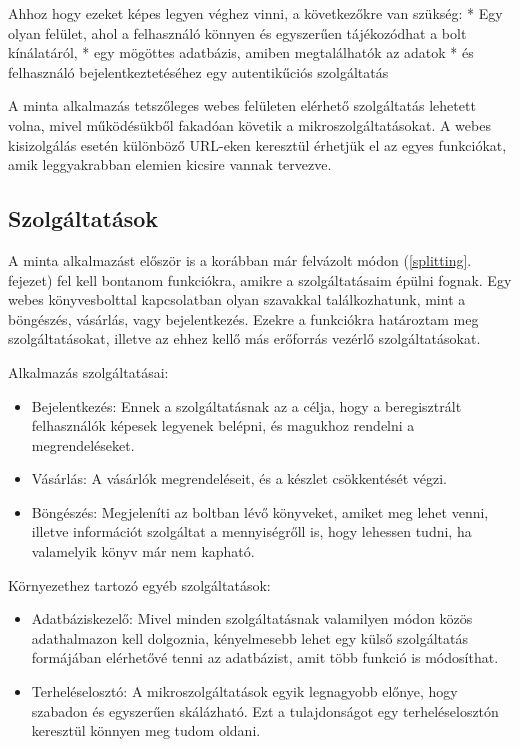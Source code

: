 \documentclass[11pt,magyar,a4paper,twoside,]{report}
\providecommand{\tightlist}{%
  \setlength{\itemsep}{0pt}\setlength{\parskip}{0pt}}
\begin{document}
Ahhoz hogy ezeket képes legyen véghez vinni, a következőkre van szükség:
* Egy olyan felület, ahol a felhasználó könnyen és egyszerűen
tájékozódhat a bolt kínálatáról, * egy mögöttes adatbázis, amiben
megtalálhatók az adatok * és felhasználó bejelentkeztetéséhez egy
autentikűciós szolgáltatás

A minta alkalmazás tetszőleges webes felületen elérhető szolgáltatás
lehetett volna, mivel működésükből fakadóan követik a
mikroszolgáltatásokat. A webes kisizolgálás esetén különböző URL-eken
keresztül érhetjük el az egyes funkciókat, amik leggyakrabban elemien
kicsire vannak tervezve.

\subsection{Szolgáltatások}\label{szolguxe1ltatuxe1sok}

A minta alkalmazást először is a korábban már felvázolt módon
(\ref{splitting}. fejezet) fel kell bontanom funkciókra, amikre a
szolgáltatásaim épülni fognak. Egy webes könyvesbolttal kapcsolatban
olyan szavakkal találkozhatunk, mint a böngészés, vásárlás, vagy
bejelentkezés. Ezekre a funkciókra határoztam meg szolgáltatásokat,
illetve az ehhez kellő más erőforrás vezérlő szolgáltatásokat.

Alkalmazás szolgáltatásai:

\begin{itemize}
\tightlist
\item
  Bejelentkezés: Ennek a szolgáltatásnak az a célja, hogy a
  beregisztrált felhasználók képesek legyenek belépni, és magukhoz
  rendelni a megrendeléseket.
\item
  Vásárlás: A vásárlók megrendeléseit, és a készlet csökkentését végzi.
\item
  Böngészés: Megjeleníti az boltban lévő könyveket, amiket meg lehet
  venni, illetve információt szolgáltat a mennyiségrőll is, hogy
  lehessen tudni, ha valamelyik könyv már nem kapható.
\end{itemize}

Környezethez tartozó egyéb szolgáltatások:

\begin{itemize}
\tightlist
\item
  Adatbáziskezelő: Mivel minden szolgáltatásnak valamilyen módon közös
  adathalmazon kell dolgoznia, kényelmesebb lehet egy külső szolgáltatás
  formájában elérhetővé tenni az adatbázist, amit több funkció is
  módosíthat.
\item
  Terheléselosztó: A mikroszolgáltatások egyik legnagyobb előnye, hogy
  szabadon és egyszerűen skálázható. Ezt a tulajdonságot egy
  terheléselosztón keresztül könnyen meg tudom oldani.
\end{itemize}
\end{document}
